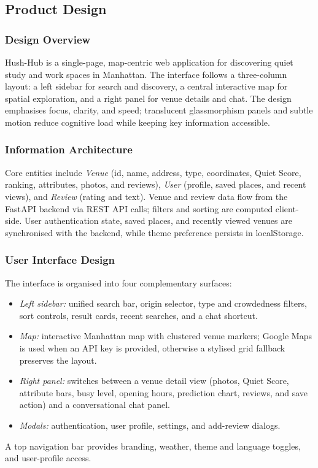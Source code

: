 \documentclass[conference]{IEEEtran}
\begin{document}
\subsection{Product Design}
\label{sec:productdesign}

\subsubsection{Design Overview}
Hush-Hub is a single-page, map-centric web application for discovering quiet study and work spaces in Manhattan. The interface follows a three-column layout: a left sidebar for search and discovery, a central interactive map for spatial exploration, and a right panel for venue details and chat. The design emphasises focus, clarity, and speed; translucent glassmorphism panels and subtle motion reduce cognitive load while keeping key information accessible.

\subsubsection{Information Architecture}
Core entities include \textit{Venue} (id, name, address, type, coordinates, Quiet Score, ranking, attributes, photos, and reviews), \textit{User} (profile, saved places, and recent views), and \textit{Review} (rating and text). Venue and review data flow from the FastAPI backend via REST API calls; filters and sorting are computed client-side. User authentication state, saved places, and recently viewed venues are synchronised with the backend, while theme preference persists in localStorage.

\subsubsection{User Interface Design}
The interface is organised into four complementary surfaces:
\begin{itemize}
  \item \textit{Left sidebar:} unified search bar, origin selector, type and crowdedness filters, sort controls, result cards, recent searches, and a chat shortcut.
  \item \textit{Map:} interactive Manhattan map with clustered venue markers; Google Maps is used when an API key is provided, otherwise a stylised grid fallback preserves the layout.
  \item \textit{Right panel:} switches between a venue detail view (photos, Quiet Score, attribute bars, busy level, opening hours, prediction chart, reviews, and save action) and a conversational chat panel.
  \item \textit{Modals:} authentication, user profile, settings, and add-review dialogs.
\end{itemize}
A top navigation bar provides branding, weather, theme and language toggles, and user-profile access.
\end{document}
